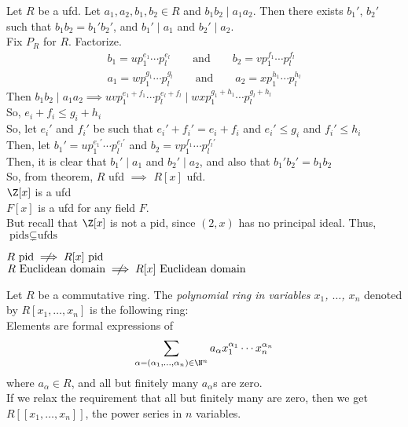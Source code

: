 \claim Let $R$ be a ufd.  Let $a_1,a_2,b_1,b_2\in R$ and $b_1b_2\mid a_1a_2$.  Then there exists $b_1'$, $b_2'$ such that $b_1b_2=b_1'b_2'$, and $b_1'\mid a_1$ and $b_2'\mid a_2$. \\
\pf Fix $P_R$ for $R$.  Factorize.
\begin{gather*}
b_1 = up_1^{e_1}\dotsm p_l^{e_l} \qquad\text{and}\qquad b_2 = vp_1^{f_1}\dotsm p_l^{f_l} \\
a_1 = wp_1^{g_1}\dotsm p_l^{g_l} \qquad\text{and}\qquad a_2 = xp_1^{h_1}\dotsm p_l^{h_l}
\end{gather*}
Then $b_1b_2\mid a_1a_2 \implies uvp_1^{e_1+f_1}\dotsm p_l^{e_l+f_l}\mid wxp_1^{g_1+h_1}\dotsm p_l^{g_l+h_l}$ \\
So, $e_i+f_i\leq g_i+h_i$ \\
So, let $e_i'$ and $f_i'$ be such that $e_i'+f_i'=e_i+f_i$ and $e_i'\leq g_i$ and $f_i'\leq h_i$ \\
Then, let $b_1'=up_1^{e_1'}\dotsm p_l^{e_l'}$ and $b_2=vp_1^{f_1}\dotsm p_l^{f_l'}$ \\
Then, it is clear that $b_1'\mid a_1$ and $b_2'\mid a_2$, and also that $b_1'b_2'=b_1b_2$ \\
So, from theorem, $R$ ufd $\implies$ $R[x]$ ufd. \\
\exs $\Z[x]$ is a ufd \\
$F[x]$ is a ufd for any field $F$. \\
But recall that $\Z[x]$ is not a pid, since $(2,x)$ has no principal ideal.  Thus, $\text{pids}\subsetneq\text{ufds}$

\observe $R\text{ pid} \centernot\implies R[x]\text{ pid}$ \\
$R\text{ Euclidean domain} \centernot\implies R[x]\text{ Euclidean domain}$

 Let $R$ be a commutative ring.  The \emph{polynomial ring in variables $x_1$, $\dotsc$, $x_n$} denoted by $R[x_1,\dotsc,x_n]$ is the following ring: \\
Elements are formal expressions of
\[ \sum_{\alpha=(\alpha_1,\dotsc,\alpha_n)\in\N^n} a_\alpha x_1^{\alpha_1}\dotsm x_n^{\alpha_n} \]
where $a_\alpha\in R$, and all but finitely many $a_\alpha$s are zero. \\
If we relax the requirement that all but finitely many are zero, then we get $R[[x_1,\dotsc,x_n]]$, the power series in $n$ variables.

